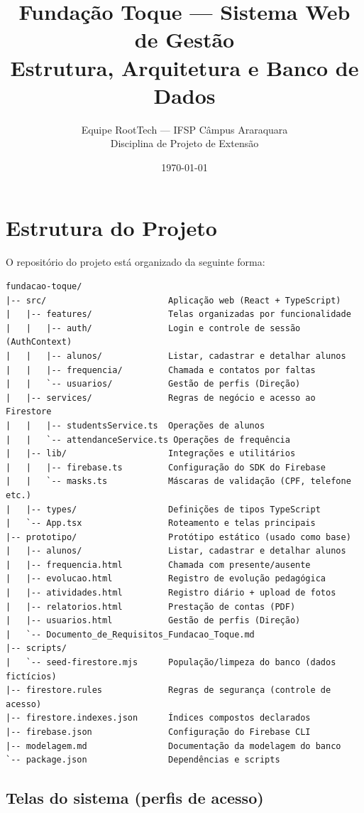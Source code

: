 \documentclass[a4paper,11pt]{article}
\title{\textbf{Fundação Toque --- Sistema Web de Gestão}\\[6pt]
\large Estrutura, Arquitetura e Banco de Dados}
\author{Equipe RootTech --- IFSP Câmpus Araraquara \\ \small Disciplina de Projeto de Extensão}
\date{\today}
\begin{document}
\maketitle

\section{Estrutura do Projeto}

O repositório do projeto está organizado da seguinte forma:

\begin{verbatim}
fundacao-toque/
|-- src/                        Aplicação web (React + TypeScript)
|   |-- features/               Telas organizadas por funcionalidade
|   |   |-- auth/               Login e controle de sessão (AuthContext)
|   |   |-- alunos/             Listar, cadastrar e detalhar alunos
|   |   |-- frequencia/         Chamada e contatos por faltas
|   |   `-- usuarios/           Gestão de perfis (Direção)
|   |-- services/               Regras de negócio e acesso ao Firestore
|   |   |-- studentsService.ts  Operações de alunos
|   |   `-- attendanceService.ts Operações de frequência
|   |-- lib/                    Integrações e utilitários
|   |   |-- firebase.ts         Configuração do SDK do Firebase
|   |   `-- masks.ts            Máscaras de validação (CPF, telefone etc.)
|   |-- types/                  Definições de tipos TypeScript
|   `-- App.tsx                 Roteamento e telas principais
|-- prototipo/                  Protótipo estático (usado como base)
|   |-- alunos/                 Listar, cadastrar e detalhar alunos
|   |-- frequencia.html         Chamada com presente/ausente
|   |-- evolucao.html           Registro de evolução pedagógica
|   |-- atividades.html         Registro diário + upload de fotos
|   |-- relatorios.html         Prestação de contas (PDF)
|   |-- usuarios.html           Gestão de perfis (Direção)
|   `-- Documento_de_Requisitos_Fundacao_Toque.md
|-- scripts/
|   `-- seed-firestore.mjs      População/limpeza do banco (dados fictícios)
|-- firestore.rules             Regras de segurança (controle de acesso)
|-- firestore.indexes.json      Índices compostos declarados
|-- firebase.json               Configuração do Firebase CLI
|-- modelagem.md                Documentação da modelagem do banco
`-- package.json                Dependências e scripts
\end{verbatim}

\subsection*{Telas do sistema (perfis de acesso)}
\end{document}
